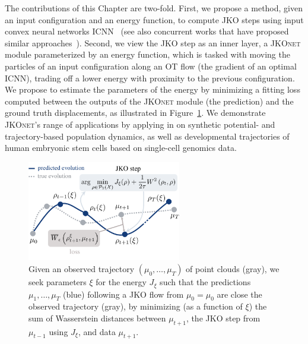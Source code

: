 The contributions of this Chapter are two-fold. First, we propose a method, given an input configuration and an energy function, to compute \acrshort{JKO} steps using input convex neural networks \acrlong{ICNN}~\citep{amos2017input,makkuva2020optimal} (see also concurrent works that have proposed similar approaches~\citep{alvarez2021optimizing, mokrov2021large}). Second, we view the \acrshort{JKO} step as an inner layer, a \textsc{JKOnet} module parameterized by an energy function, which is tasked with moving the particles of an input configuration along an OT flow (the gradient of an optimal ICNN), trading off a lower energy with proximity to the previous configuration.
We propose to estimate the parameters of the energy by minimizing a fitting loss %
computed between the outputs of the \textsc{JKOnet} module (the prediction) and the ground truth displacements, as illustrated in Figure~\ref{fig:overview_jkonet}.
We demonstrate \textsc{JKOnet}'s range of applications by applying in on synthetic potential- and trajectory-based population dynamics, as well as developmental trajectories of human embryonic stem cells based on single-cell genomics data.

\begin{figure}[t]
    \centering
    \includegraphics[width=0.6\textwidth]{figures/fig_overview_jkonet.pdf}
    \caption{Given an observed trajectory $(\mu_0,\dots,\mu_T)$ of point clouds (gray), we seek parameters $\xi$ for the energy $J_\xi$ such that the predictions $\mu_1, \dots, \mu_T$ (blue) following a \acrshort{JKO} flow from $\mu_0=\mu_0$ are close the observed trajectory (gray), by minimizing (as a function of $\xi$) the sum of Wasserstein distances between $\mu_{t+1}$, the \acrshort{JKO} step from $\mu_{t-1}$ using $J_\xi$, and data $\mu_{t+1}$.}
    \label{fig:overview_jkonet}
\end{figure}


